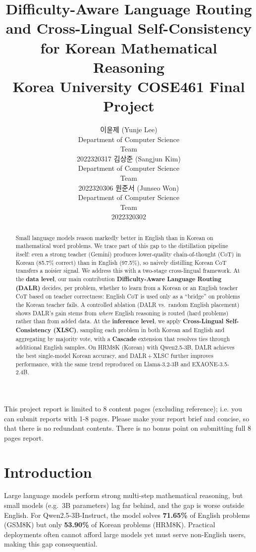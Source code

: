 \documentclass{article}
\title{
  Difficulty-Aware Language Routing and Cross-Lingual Self-Consistency \\
  for Korean Mathematical Reasoning \\
  \vspace{1em}
  \small{\normalfont Korea University COSE461 Final Project}
}
\author{
  이윤제 (Yunje Lee) \\
   Department of Computer Science \\
   Team \note{N} \\
   2022320317
  \And
   김상준 (Sangjun Kim) \\
   Department of Computer Science \\
   Team \note{N} \\
   2022320306
  \And
   원준서 (Junseo Won) \\
   Department of Computer Science \\
   Team \note{N} \\
   2022320302
}
\begin{document}
\maketitle

\begin{abstract}
Small language models reason markedly better in English than in Korean on
mathematical word problems. We trace part of this gap to the
distillation pipeline itself: even a strong teacher (Gemini) produces
lower-quality chain-of-thought (CoT) in Korean (85.7\% correct) than in
English (97.5\%), so naively distilling Korean CoT transfers a noisier
signal. We address this with a two-stage cross-lingual framework. At the
\textbf{data level}, our main contribution \textbf{Difficulty-Aware
Language Routing (DALR)} decides, per problem, whether to learn from a
Korean or an English teacher CoT based on teacher correctness: English
CoT is used only as a ``bridge'' on problems the Korean teacher fails.
A controlled ablation (DALR vs.\ random English placement) shows DALR's
gain stems from \emph{where} English reasoning is routed (hard problems)
rather than from added data. At the \textbf{inference level}, we apply
\textbf{Cross-Lingual Self-Consistency (XLSC)}, sampling each problem in
both Korean and English and aggregating by majority vote, with a
\textbf{Cascade} extension that resolves ties through additional English
samples. On HRM8K (Korean) with Qwen2.5-3B, DALR achieves the best
single-model Korean accuracy, and DALR\,+\,XLSC further improves
performance, with the same trend reproduced on Llama-3.2-3B and
EXAONE-3.5-2.4B.
\end{abstract}

This project report is limited to 8 content pages (excluding reference); i.e. you can submit reports with 1-8 pages. Please make your report brief and concise, so that there is no redundant contents. There is no bonus point on submitting full 8 pages report.

\section{Introduction}
Large language models perform strong multi-step mathematical reasoning,
but small models (e.g.\ 3B parameters) lag far behind, and the gap is
worse outside English. For Qwen2.5-3B-Instruct, the model solves
\textbf{71.65\%} of English problems (GSM8K) but only \textbf{53.90\%}
of Korean problems (HRM8K). Practical deployments often cannot afford
large models yet must serve non-English users, making this gap
consequential.
\end{document}
